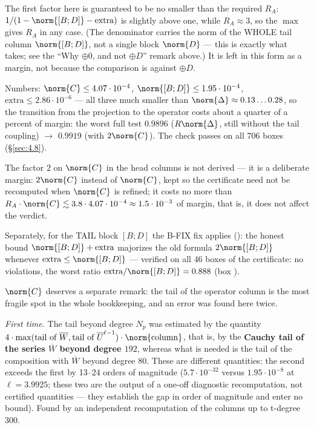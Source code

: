 The first factor here is guaranteed to be no smaller than the required
$R_{A}$: $1/(1-\norm{[B;D]}-\mathrm{extra})$ is slightly above one, while
$R_{A} \approx 3$, so the $\max$ gives $R_{A}$ in any case. (The
denominator carries the norm of the WHOLE tail column $\norm{[B;D]}$,
not a single block $\norm{D}$ --- this is exactly what
 takes; see the ``Why $\oplus 0$, and not
$\oplus D$'' remark above.) It is left in this form as a margin, not
because the comparison is against $\oplus D$.

Numbers: $\norm{C} \le 4.07\cdot 10^{-4}$,
$\norm{[B;D]} \le 1.95\cdot 10^{-4}$,
$\mathrm{extra} \le 2.86\cdot 10^{-6}$ --- all three much smaller than
$\norm{\Delta} \approx 0.13\ldots 0.28$, so the transition from the
projection to the operator costs about a quarter of a percent of margin:
the worst full test $0.9896$ ($R\norm{\Delta}$, still without the tail
coupling) $\to$ $\mathbf{0.9919}$ (with $2\norm{C}$). The check passes on
all $706$ boxes (\S\ref{sec:4.8}).

The factor $2$ on $\norm{C}$ in the head columns is not derived --- it is
a deliberate margin: $2\norm{C}$ instead of $\norm{C}$, kept so the
certificate need not be recomputed when $\norm{C}$ is refined; it costs
no more than
$R_{A}\cdot \norm{C} \lesssim 3.8\cdot 4.07\cdot 10^{-4} \approx
1.5\cdot 10^{-3}$ of margin, that is, it does not affect the verdict.

Separately, for the TAIL block $[B;D]$ the B-FIX fix applies
(): the honest bound
$\norm{[B;D]} + \mathrm{extra}$ majorizes the old formula
$2\norm{[B;D]}$ whenever $\mathrm{extra} \le \norm{[B;D]}$ --- verified on
all $46$ boxes of the certificate: no violations, the worst ratio
$\mathrm{extra}/\norm{[B;D]} = 0.888$ (box ).

$\norm{C}$ deserves a separate remark: the tail of the operator column is
the most fragile spot in the whole bookkeeping, and an error was found
here twice.

\emph{First time.} The tail beyond degree $N_{p}$ was estimated by the
quantity $4\cdot \max(\text{tail of } \overline{W}, \text{tail of }
\overline{U}^{\ell-1})\cdot \norm{\mathrm{column}}$, that is, by the
\textbf{Cauchy tail of the series $\overline{W}$ beyond degree $192$},
whereas what is needed is the tail of the composition with $\overline{W}$
beyond degree $80$. These are different quantities: the second exceeds the
first by 13--24 orders of magnitude ($5.7\cdot 10^{-32}$ versus
$1.95\cdot 10^{-8}$ at $\ell = 3.9925$; these two are the output of a one-off
diagnostic recomputation, not certified quantities --- they establish the gap
in order of magnitude and enter no bound). Found by an independent
recomputation of the columns up to t-degree $300$.

